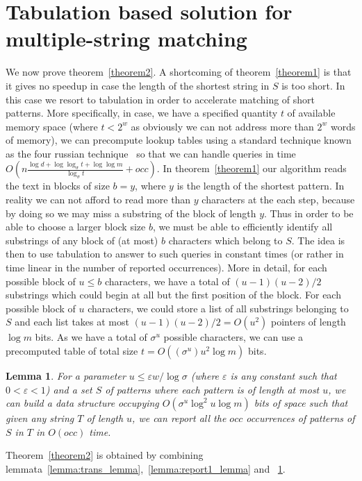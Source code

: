 \documentclass{article}
\newcommand{\?}{\mskip1.5mu}
\newtheorem{lemma}{Lemma}
\renewcommand{\epsilon}{\varepsilon}
\begin{document}
\section{Tabulation based solution for multiple-string matching}
\label{section:tabul_sol}
We now prove theorem~\ref{theorem2}. 
A shortcoming of theorem~\ref{theorem1} is that it gives no speedup in case the length of the shortest string in $S$ is too short. In this case we resort to tabulation in order to accelerate matching of short patterns. More specifically, in case, we have a specified quantity $t$ of available memory space (where $t<2^w$ as obviously we can not address more than $2^w$ words of memory), we can precompute lookup tables using a standard technique known as the four russian technique~\cite{ADKF70} so that we can handle queries in time $O(n\frac{\log d+\log\log_\sigma t+\log\log m}{\log_\sigma t}+occ)$. In theorem~\ref{theorem1} our algorithm reads the text in blocks of size $b=y$, where $y$ is the length of the shortest pattern. In reality we can not afford to read more than $y$ characters at the each step, because by doing so we may miss a substring of the block of length $y$. Thus in order to be able to choose a larger block size $b$, we must be able to efficiently identify all substrings of any block of (at most) $b$ characters which belong to $S$. The idea is then to use tabulation to answer to such queries in constant times (or rather in time linear in the number of reported occurrences). More in detail, for each possible block of $u\leq b$ characters, we have a total of $(u-1)(u-2)/2$ substrings which could begin at all but the first position of the block. For each possible block of $u$ characters, we could store a list of all substrings belonging to $S$ and each list takes at most $(u-1)(u-2)/2=O(u^2)$ pointers of length $\log m$ bits. As we have a total of $\sigma^u$ possible characters, we can use a precomputed table of total size $t=O((\sigma^u)u^2\log m)$ bits. \begin{lemma}
\label{lemma:report2_lemma}
For a parameter $u\leq \epsilon w/\log\sigma$ (where $\epsilon$ is any constant such that $0<\epsilon<1$) and a set $S$ of patterns where each pattern is of length at most $u$, we can build a data structure occupying $O(\sigma^u\log^2 u\log m)$ bits of space such that given any string $T$ of length $u$, we can report all the $occ$ occurrences of patterns of $S$ in $T$ in $O(occ)$ time. 
\end{lemma}
Theorem~\ref{theorem2} is obtained by combining lemmata~\ref{lemma:trans_lemma},~\ref{lemma:report1_lemma} and ~\ref{lemma:report2_lemma}.
\end{document}
